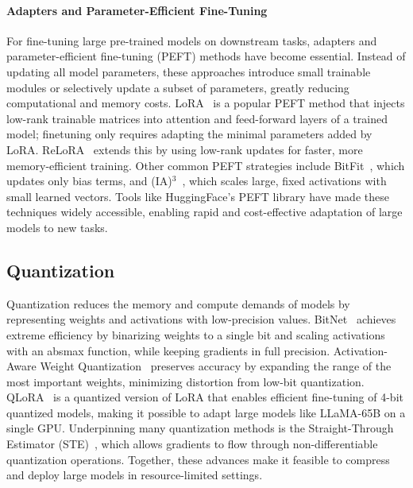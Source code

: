 \paragraph{Adapters and Parameter-Efficient Fine-Tuning}

For fine-tuning large pre-trained models on downstream tasks, adapters and parameter-efficient fine-tuning (PEFT) methods have become essential. Instead of updating all model parameters, these approaches introduce small trainable modules or selectively update a subset of parameters, greatly reducing computational and memory costs. LoRA~\citep{hu2021lora} is a popular PEFT method that injects low-rank trainable matrices into attention and feed-forward layers of a trained model; finetuning only requires adapting the minimal parameters added by LoRA. ReLoRA~\citep{lialin2023relora} extends this by using low-rank updates for faster, more memory-efficient training. Other common PEFT strategies include BitFit~\citep{benzaken2022bitfit}, which updates only bias terms, and (IA)$^3$~\citep{liu2022few}, which scales large, fixed activations with small learned vectors. Tools like HuggingFace's PEFT library have made these techniques widely accessible, enabling rapid and cost-effective adaptation of large models to new tasks.



\subsection{Quantization}
Quantization reduces the memory and compute demands of models by representing weights and activations with low-precision values. BitNet~\citep{wang2023bitnet} achieves extreme efficiency by binarizing weights to a single bit and scaling activations with an absmax function, while keeping gradients in full precision. Activation-Aware Weight Quantization~\citep{lin2023awq} preserves accuracy by expanding the range of the most important weights, minimizing distortion from low-bit quantization. QLoRA~\citep{dettmers2023qlora} is a quantized version of LoRA that enables efficient fine-tuning of 4-bit quantized models, making it possible to adapt large models like LLaMA-65B on a single GPU. Underpinning many quantization methods is the Straight-Through Estimator (STE)~\citep{bengio2013estimating}, which allows gradients to flow through non-differentiable quantization operations. Together, these advances make it feasible to compress and deploy large models in resource-limited settings.

